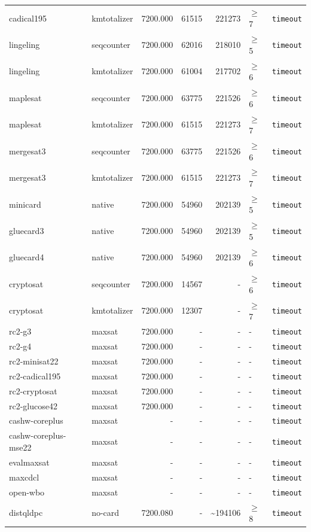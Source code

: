 \begin{longtable}{llrrrl p{}}
cadical195 & kmtotalizer & 7200.000 & 61515 & 221273 & $\geq$7 & \texttt{timeout} \\
lingeling & seqcounter & 7200.000 & 62016 & 218010 & $\geq$5 & \texttt{timeout} \\
lingeling & kmtotalizer & 7200.000 & 61004 & 217702 & $\geq$6 & \texttt{timeout} \\
maplesat & seqcounter & 7200.000 & 63775 & 221526 & $\geq$6 & \texttt{timeout} \\
maplesat & kmtotalizer & 7200.000 & 61515 & 221273 & $\geq$7 & \texttt{timeout} \\
mergesat3 & seqcounter & 7200.000 & 63775 & 221526 & $\geq$6 & \texttt{timeout} \\
mergesat3 & kmtotalizer & 7200.000 & 61515 & 221273 & $\geq$7 & \texttt{timeout} \\
minicard & native & 7200.000 & 54960 & 202139 & $\geq$5 & \texttt{timeout} \\
gluecard3 & native & 7200.000 & 54960 & 202139 & $\geq$5 & \texttt{timeout} \\
gluecard4 & native & 7200.000 & 54960 & 202139 & $\geq$6 & \texttt{timeout} \\
cryptosat & seqcounter & 7200.000 & 14567 & - & $\geq$6 & \texttt{timeout} \\
cryptosat & kmtotalizer & 7200.000 & 12307 & - & $\geq$7 & \texttt{timeout} \\
rc2-g3 & maxsat & 7200.000 & - & - & - & \texttt{timeout} \\
rc2-g4 & maxsat & 7200.000 & - & - & - & \texttt{timeout} \\
rc2-minisat22 & maxsat & 7200.000 & - & - & - & \texttt{timeout} \\
rc2-cadical195 & maxsat & 7200.000 & - & - & - & \texttt{timeout} \\
rc2-cryptosat & maxsat & 7200.000 & - & - & - & \texttt{timeout} \\
rc2-glucose42 & maxsat & 7200.000 & - & - & - & \texttt{timeout} \\
cashw-coreplus & maxsat & - & - & - & - & \texttt{timeout} \\
cashw-coreplus-mse22 & maxsat & - & - & - & - & \texttt{timeout} \\
evalmaxsat & maxsat & - & - & - & - & \texttt{timeout} \\
maxcdcl & maxsat & - & - & - & - & \texttt{timeout} \\
open-wbo & maxsat & - & - & - & - & \texttt{timeout} \\
distqldpc & no-card & 7200.080 & - & \textasciitilde{}194106 & $\geq$8 & \texttt{timeout} \\

\end{longtable}
